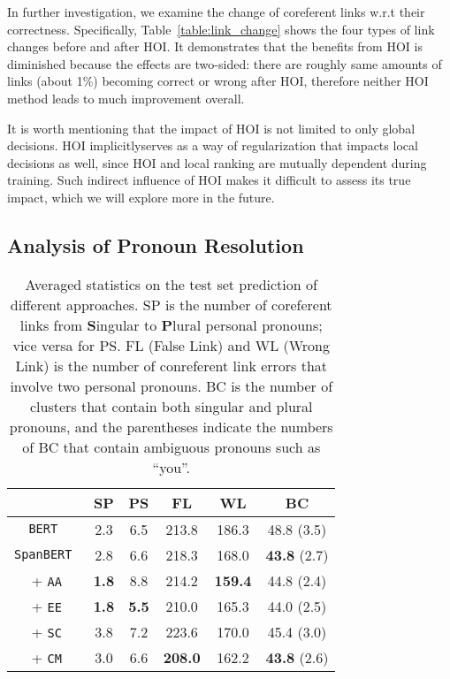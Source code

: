 \documentclass[11pt,a4paper]{article}
\newcommand\LN{\linebreak\noindent}
\begin{document}
In further investigation, we examine the change of coreferent links w.r.t their correctness. Specifically, Table~\ref{table:link_change} shows the four types of link changes before and after HOI. It demonstrates that the benefits from HOI is diminished because the effects are two-sided: there are roughly same amounts of links (about 1\%) becoming correct or wrong after HOI, therefore neither HOI method leads to much improvement overall.

It is worth mentioning that the impact of HOI is not limited to only global decisions.
HOI implicitly\LN serves as a way of regularization that impacts local decisions as well, since HOI and local ranking are mutually dependent during training.
Such indirect influence of HOI makes it difficult to assess its true impact, which we will explore more in the future.






\subsection{Analysis of Pronoun Resolution}
\label{subsec:pronoun}

\begin{table}[htbp!]
\small
\centering
\begin{tabular}{c|cc|cc|c}
\multicolumn{1}{c|}{} & \multicolumn{1}{c}{SP} & \multicolumn{1}{c|}{PS} & \multicolumn{1}{c}{FL} & \multicolumn{1}{c|}{WL} & \multicolumn{1}{c}{BC} \\
\midrule
\tt BERT     & 2.3 & 6.5 & 213.8 & 186.3 & 48.8 (3.5) \\
\tt SpanBERT & 2.8 & 6.6 & 218.3 & 168.0 & \textbf{43.8} (2.7) \\
 + \texttt{AA} & \bf 1.8 & 8.8 & 214.2 & \bf 159.4 & 44.8 (2.4) \\
 + \texttt{EE} & \bf 1.8 & \bf 5.5 & 210.0 & 165.3 & 44.0 (2.5) \\
 + \texttt{SC} & 3.8 & 7.2 & 223.6 & 170.0 & 45.4 (3.0) \\
 + \texttt{CM} & 3.0 & 6.6 & \bf 208.0 & 162.2 &\textbf{43.8} (2.6) \\
\end{tabular}
\caption{Averaged statistics on the test set prediction of different approaches. SP is the number of coreferent links from \textbf{S}ingular to \textbf{P}lural personal pronouns; vice versa for PS. FL (False Link) and WL (Wrong Link) is the number of conreferent link errors that involve two personal pronouns. BC is the number of clusters that contain both singular and plural pronouns, and the parentheses indicate the numbers of BC that contain ambiguous pronouns such as ``you''.}
\label{table:analysis}
\vspace{-3ex}
\end{table}
\end{document}
